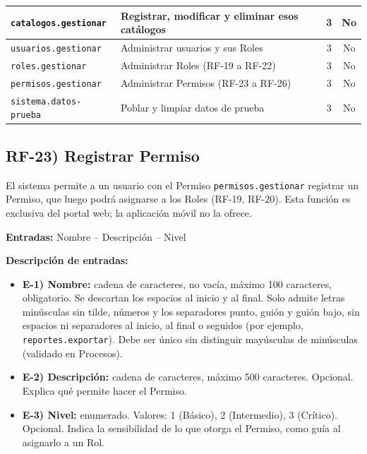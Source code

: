 \begin{center}
\begin{tabular}{|l|p{6.5cm}|c|c|}
\texttt{catalogos.gestionar} & Registrar, modificar y eliminar esos cat\'alogos & 3 & No \\ \hline
\texttt{usuarios.gestionar} & Administrar usuarios y sus Roles & 3 & No \\ \hline
\texttt{roles.gestionar} & Administrar Roles (RF-19 a RF-22) & 3 & No \\ \hline
\texttt{permisos.gestionar} & Administrar Permisos (RF-23 a RF-26) & 3 & No \\ \hline
\texttt{sistema.datos-prueba} & Poblar y limpiar datos de prueba & 3 & No \\ \hline
\end{tabular}
\end{center}

\subsection*{RF-23) Registrar Permiso}
El sistema permite a un usuario con el Permiso \texttt{permisos.gestionar} registrar un Permiso, que luego podr\'a asignarse a los Roles (RF-19, RF-20). Esta funci\'on es exclusiva del portal web; la aplicaci\'on m\'ovil no la ofrece.

\textbf{Entradas:} Nombre -- Descripci\'on -- Nivel

\textbf{Descripci\'on de entradas:}
\begin{itemize}[label={}, leftmargin=1.5em]
  \item \textbf{E-1) Nombre:} cadena de caracteres, no vac\'ia, m\'aximo 100 caracteres, obligatorio. Se descartan los espacios al inicio y al final. Solo admite letras min\'usculas sin tilde, n\'umeros y los separadores punto, gui\'on y gui\'on bajo, sin espacios ni separadores al inicio, al final o seguidos (por ejemplo, \texttt{reportes.exportar}). Debe ser \'unico sin distinguir may\'usculas de min\'usculas (validado en Procesos).
  \item \textbf{E-2) Descripci\'on:} cadena de caracteres, m\'aximo 500 caracteres. Opcional. Explica qu\'e permite hacer el Permiso.
  \item \textbf{E-3) Nivel:} enumerado. Valores: 1 (B\'asico), 2 (Intermedio), 3 (Cr\'itico). Opcional. Indica la sensibilidad de lo que otorga el Permiso, como gu\'ia al asignarlo a un Rol.
\end{itemize}

